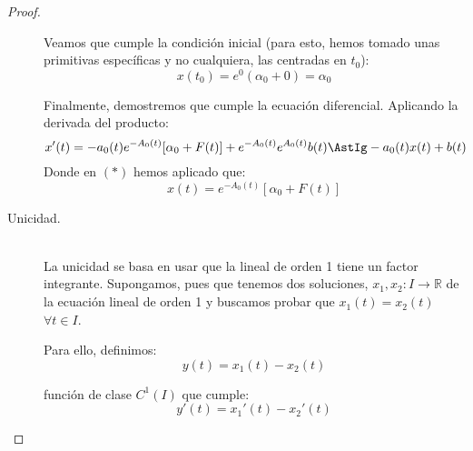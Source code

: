 \begin{prop}
\begin{proof}
\begin{description}
                Veamos que cumple la condición inicial (para esto, hemos tomado unas primitivas específicas y no cualquiera, las centradas en $t_0$):
                \begin{equation*}
                    x(t_0) = e^0 (\alpha_0 + 0) = \alpha_0
                \end{equation*}

                Finalmente, demostremos que cumple la ecuación diferencial. Aplicando la derivada del producto:
                \begin{equation*}
                    x'(t) = -a_0(t)e^{-A_0(t)} [\alpha_0 + F(t)] + e^{-A_0(t)}e^{A_0(t)}b(t) \AstIg -a_0(t) x(t) + b(t)
                \end{equation*}
                Donde en $(\ast)$ hemos aplicado que:
                \begin{equation*}
                    x(t) = e^{-A_0(t)} [\alpha_0 + F(t)]
                \end{equation*}
            \item [Unicidad.]~\\
                La unicidad se basa en usar que la lineal de orden 1 tiene un factor integrante. Supongamos, pues que tenemos dos soluciones, $x_1,x_2:I\rightarrow\mathbb{R}$ de la ecuación lineal de orden 1 y buscamos probar que $x_1(t) = x_2(t)$ $\forall t\in I$.
                
                Para ello, definimos:
                \begin{equation*}
                    y(t) = x_1(t) - x_2(t)
                \end{equation*}
                
                función de clase $C^1(I)$ que cumple:
                \begin{equation*}
                    y'(t) = x_1'(t) - x_2'(t)
                \end{equation*}
                

\end{description}
\end{proof}
\end{prop}
